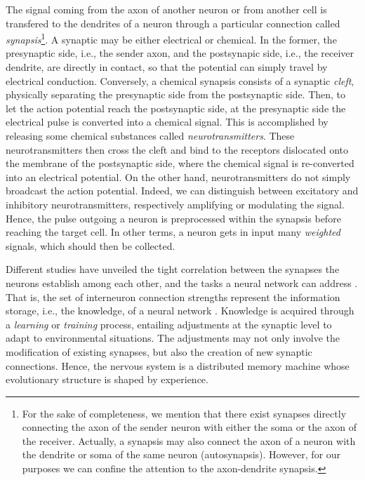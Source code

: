\documentclass[12pt, a4paper, twoside, openright]{report}
\numberwithin{equation}{chapter}
\theoremstyle{theorem}
\theoremstyle{definition}
\theoremstyle{remark}
\theoremstyle{proposition}
\numberwithin{figure}{chapter}
\begin{document}
		The signal coming from the axon of another neuron or from another cell is transfered to the dendrites of a neuron through a particular connection called \emph{synapsis}\footnote{For the sake of completeness, we mention that there exist synapses directly connecting the axon of the sender neuron with either the soma or the axon of the receiver. Actually, a synapsis may also connect the axon of a neuron with the dendrite or soma of the same neuron (autosynapsis). However, for our purposes we can confine the attention to the axon-dendrite synapsis.}. A synaptic may be either electrical or chemical. In the former, the presynaptic side, i.e., the sender axon, and the postsynapic side, i.e., the receiver dendrite, are directly in contact, so that the potential can simply travel by electrical conduction. Conversely, a chemical synapsis consists of a synaptic \emph{cleft}, physically separating the presynaptic side from the postsynaptic side. Then, to let the action potential reach the postsynaptic side, at the presynaptic side the electrical pulse is converted into a chemical signal. This is accomplished by releasing some chemical substances called \emph{neurotransmitters}. These neurotransmitters then cross the cleft and bind to the receptors dislocated onto the membrane of the postsynaptic side, where the chemical signal is re-converted into an electrical potential. On the other hand, neurotransmitters do not simply broadcast the action potential. Indeed, we can distinguish between excitatory and inhibitory neurotransmitters, respectively amplifying or modulating the signal. Hence, the pulse outgoing a neuron is preprocessed within the synapsis before reaching the target cell. In other terms, a neuron gets in input many \emph{weighted} signals, which should then be collected.
		
		 Different studies have unveiled the tight correlation between the synapses the neurons establish among each other, and the tasks a neural network can address \cite{Hag14}. That is, the set of interneuron connection strengths represent the information storage, i.e., the knowledge, of a neural network \cite{Kri}. Knowledge is acquired through a \emph{learning} or \emph{training} process, entailing adjustments at the synaptic level to adapt to environmental situations. The adjustments may not only involve the modification of existing synapses, but also the creation of new synaptic connections. Hence, the nervous system is a distributed memory machine whose evolutionary structure is shaped by experience.
		 
\end{document}
